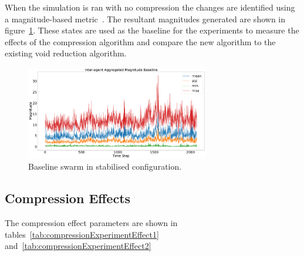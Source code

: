 \documentclass[12pt,a4paper]{IEEEtran}
\begin{document}
When the simulation is ran with no compression the changes are identified using a magnitude-based metric~\cite{eliot2018metric}. The resultant magnitudes generated are shown in figure~\ref{fig:baselineSwarmMagnitude}. These states are used as the baseline for the experiments to measure the effects of the compression algorithm and compare the new algorithm to the existing void reduction algorithm.

\begin{figure}[H]
	\begin{center}
		\includegraphics[width=8cm]{figures/interagentMagnitudeBaseline}
	\end{center}
	\caption{Baseline swarm in stabilised configuration. \label{fig:baselineSwarmMagnitude}}
\end{figure}

\subsection{Compression Effects\label{sec:CompressionEffect}}

The compression effect parameters are shown in tables~\ref{tab:compressionExperimentEffect1} and~\ref{tab:compressionExperimentEffect2}
\end{document}
